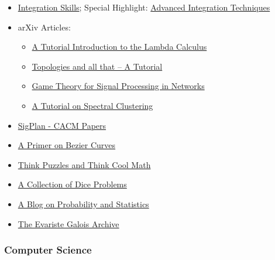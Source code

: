 \begin{itemize}

	\item \href{http://math.stackexchange.com/questions/765198/some-users-are-mind-bogglingly-skilled-at-integration-how-did-they-get-there/1063528\#1063528}{Integration
	Skills}; Special Highlight: \href{http://faculty.swosu.edu/michael.dougherty/book/chapter07.pdf}{Advanced
	Integration Techniques}

	\item arXiv Articles:

	\begin{itemize}
		\item \href{http://arxiv.org/abs/1503.09060}{A Tutorial Introduction to
			the Lambda Calculus}
		\item \href{http://arxiv.org/abs/1503.00875}{Topologies and all that -- A
			Tutorial}
		\item \href{http://arxiv.org/abs/1506.00982}{Game Theory for Signal
			Processing in Networks}
		\item \href{http://arxiv.org/abs/0711.0189}{A Tutorial on Spectral
			Clustering}
	\end{itemize}

	\item \href{http://www.sigplan.org/Newsletters/CACM/Papers/}{SigPlan - CACM Papers}

	\item \href{https://pomax.github.io/bezierinfo/}{A Primer on Bezier Curves}

	\item \href{http://www.jamestanton.com/?category_name=puzzles}{Think Puzzles and Think Cool Math}

	\item \href{dice1.pdf}{A Collection of Dice Problems}

	\item \href{https://probabilityandstats.wordpress.com/}{A Blog on
	Probability and Statistics}

	\item  \href{http://www.galois-group.net/g/EN/theory.html}{The Evariste Galois Archive}

\end{itemize}

\subsubsection{Computer Science}

